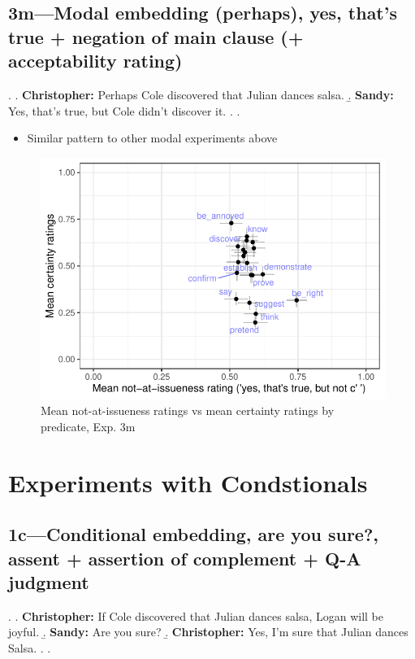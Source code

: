 \documentclass[11pt]{article}
\begin{document}

	\pagebreak
	\subsection{3m---Modal embedding (perhaps), yes, that's true + negation of main clause (+ acceptability rating)} %
		\ex. \a. \textbf{Christopher:} Perhaps Cole discovered that Julian dances salsa.
			\b. \textbf{Sandy:} Yes, that’s true, but Cole didn't discover it.
			\z.
		\z.

		\begin{itemize}
			\item Similar pattern to other modal experiments above
		\end{itemize}

		\begin{figure}[h]
			\centering
			\includegraphics[]{figures/m3-correl.pdf}
			\caption{Mean not-at-issueness ratings vs mean certainty ratings by predicate, Exp. 3m}
			\label{fig:m3-corr}
		\end{figure}
	
	

\section{Experiments with Condstionals}

	\subsection{1c---Conditional embedding,  are you sure?, assent + assertion of complement + Q-A judgment}
		\ex. \a. \textbf{Christopher:} If Cole discovered that Julian dances salsa, Logan will be joyful.
			\b. \textbf{Sandy:} Are you sure?
			\b. \textbf{Christopher:} Yes, I'm sure that Julian dances Salsa.
			\z.
		\z.
\end{document}
